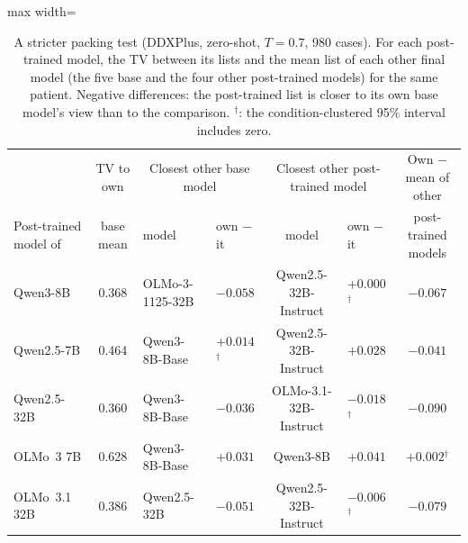 \documentclass[11pt]{article}
\begin{document}
\begin{table}[t]
\centering\small
\begin{adjustbox}{max width=\linewidth}
\begin{tabular}{lcllclc}
\toprule
 & TV to own & \multicolumn{2}{c}{Closest other base model} & \multicolumn{2}{c}{Closest other post-trained model} & Own $-$ mean of other \\
Post-trained model of & base mean & model & own $-$ it & model & own $-$ it & post-trained models \\
\midrule
Qwen3-8B & 0.368 & OLMo-3-1125-32B & $-0.058$ & Qwen2.5-32B-Instruct & $+0.000$$^{\dagger}$ & $-0.067$ \\
Qwen2.5-7B & 0.464 & Qwen3-8B-Base & $+0.014$$^{\dagger}$ & Qwen2.5-32B-Instruct & $+0.028$ & $-0.041$ \\
Qwen2.5-32B & 0.360 & Qwen3-8B-Base & $-0.036$ & OLMo-3.1-32B-Instruct & $-0.018$$^{\dagger}$ & $-0.090$ \\
OLMo~3 7B & 0.628 & Qwen3-8B-Base & $+0.031$ & Qwen3-8B & $+0.041$ & $+0.002$$^{\dagger}$ \\
OLMo~3.1 32B & 0.386 & Qwen2.5-32B & $-0.051$ & Qwen2.5-32B-Instruct & $-0.006$$^{\dagger}$ & $-0.079$ \\
\bottomrule
\end{tabular}
\end{adjustbox}
\caption{A stricter packing test (DDXPlus, zero-shot, $T{=}0.7$, 980 cases). For each post-trained model, the TV between its lists and the mean list of each other final model (the five base and the four other post-trained models) for the same patient. Negative differences: the post-trained list is closer to its own base model's view than to the comparison. $^{\dagger}$: the condition-clustered 95\% interval includes zero.}
\label{tab:packstrict}
\end{table}
\end{document}
